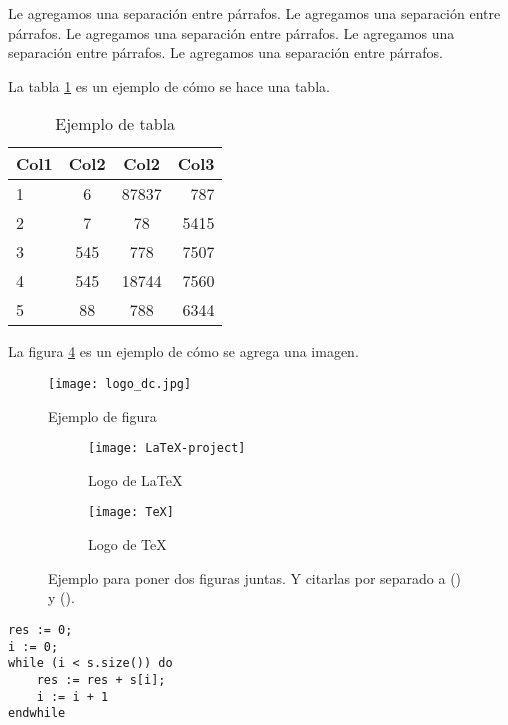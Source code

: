 \documentclass[10pt,a4paper]{article}
\begin{document}
\vspace{0.3cm}

Le agregamos una separación entre párrafos. Le agregamos una separación entre párrafos. Le agregamos una separación entre párrafos. Le agregamos una separación entre párrafos. Le agregamos una separación entre párrafos.

\vspace{0.3cm}

La tabla \ref{tab:ejemplo} es un ejemplo de cómo se hace una tabla.

\begin{table}[h!]
	\centering
	\begin{tabular}{||l c c r||} 
		\hline
		Col1 & Col2 & Col2 & Col3 \\ [0.5ex] 
		\hline\hline
		1 & 6 & 87837 & 787 \\ 
		2 & 7 & 78 & 5415 \\
		3 & 545 & 778 & 7507 \\
		4 & 545 & 18744 & 7560 \\
		5 & 88 & 788 & 6344 \\
		\hline
	\end{tabular}
	\caption{Ejemplo de tabla}
	\label{tab:ejemplo}
\end{table}


La figura \ref{fig:subfigs} es un ejemplo de cómo se agrega una imagen.

\begin{figure}[ht]
	\centering
	\texttt{[image: logo\_dc.jpg]}
	\caption{Ejemplo de figura}
	\label{fig:ejemplo}
\end{figure}

\begin{figure}[ht!]
	\begin{subfigure}{0.5\textwidth}
		\texttt{[image: LaTeX-project]} 
		\caption{Logo de LaTeX}
		\label{fig:subfig1}
	\end{subfigure}
	\begin{subfigure}{0.5\textwidth}
		\texttt{[image: TeX]}
		\caption{Logo de TeX}
		\label{fig:subfig2}
	\end{subfigure}
	\caption{Ejemplo para poner dos figuras juntas. Y citarlas por separado a () y ().}
	\label{fig:subfigs}
\end{figure}



	\begin{lstlisting}[caption={Ejemplo de código (usando los estilos de la cátedra, ver las macros para más detalles)},label=code:for]
res := 0;
i := 0;
while (i < s.size()) do
	res := res + s[i];
	i := i + 1
endwhile
	\end{lstlisting}
\end{document}
